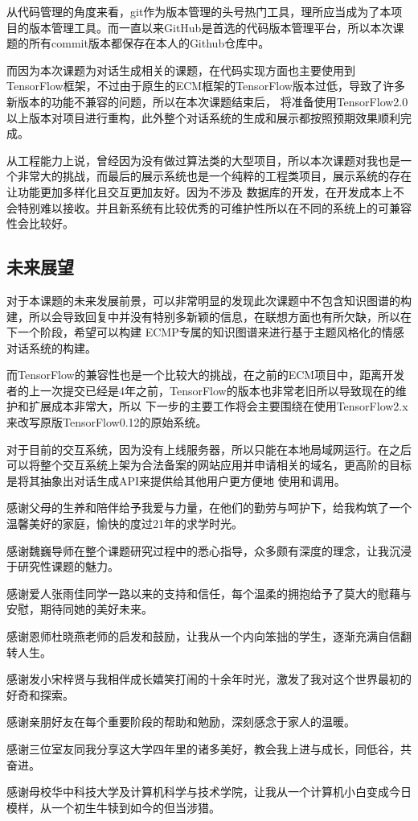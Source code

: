 \documentclass[supercite]{HustGraduPaper}
\theoremstyle{definition}
\begin{document}
从代码管理的角度来看，git作为版本管理的头号热门工具，理所应当成为了本项目的版本管理工具。而一直以来GitHub是首选的代码版本管理平台，所以本次课题的所有commit版本都保存在本人的Github仓库中。

而因为本次课题为对话生成相关的课题，在代码实现方面也主要使用到TensorFlow框架，不过由于原生的ECM框架的TensorFlow版本过低，导致了许多新版本的功能不兼容的问题，所以在本次课题结束后，
将准备使用TensorFlow2.0以上版本对项目进行重构，此外整个对话系统的生成和展示都按照预期效果顺利完成。

从工程能力上说，曾经因为没有做过算法类的大型项目，所以本次课题对我也是一个非常大的挑战，而最后的展示系统也是一个纯粹的工程类项目，展示系统的存在让功能更加多样化且交互更加友好。因为不涉及
数据库的开发，在开发成本上不会特别难以接收。并且新系统有比较优秀的可维护性所以在不同的系统上的可兼容性会比较好。

\subsection{未来展望}
对于本课题的未来发展前景，可以非常明显的发现此次课题中不包含知识图谱的构建，所以会导致回复中并没有特别多新颖的信息，在联想方面也有所欠缺，所以在下一个阶段，希望可以构建
ECMP专属的知识图谱来进行基于主题风格化的情感对话系统的构建。

而TensorFlow的兼容性也是一个比较大的挑战，在之前的ECM项目中，距离开发者的上一次提交已经是4年之前，TensorFlow的版本也非常老旧所以导致现在的维护和扩展成本非常大，所以
下一步的主要工作将会主要围绕在使用TensorFlow2.x来改写原版TensorFlow0.12的原始系统。

对于目前的交互系统，因为没有上线服务器，所以只能在本地局域网运行。在之后可以将整个交互系统上架为合法备案的网站应用并申请相关的域名，更高阶的目标是将其抽象出对话生成API来提供给其他用户更方便地
使用和调用。


\begin{thankpage}
感谢父母的生养和陪伴给予我爱与力量，在他们的勤劳与呵护下，给我构筑了一个温馨美好的家庭，愉快的度过21年的求学时光。

感谢魏巍导师在整个课题研究过程中的悉心指导，众多颇有深度的理念，让我沉浸于研究性课题的魅力。

感谢爱人张雨佳同学一路以来的支持和信任，每个温柔的拥抱给予了莫大的慰藉与安慰，期待同她的美好未来。

感谢恩师杜晓燕老师的启发和鼓励，让我从一个内向笨拙的学生，逐渐充满自信翻转人生。

感谢发小宋梓贤与我相伴成长嬉笑打闹的十余年时光，激发了我对这个世界最初的好奇和探索。

感谢亲朋好友在每个重要阶段的帮助和勉励，深刻感念于家人的温暖。

感谢三位室友同我分享这大学四年里的诸多美好，教会我上进与成长，同低谷，共奋进。

感谢母校华中科技大学及计算机科学与技术学院，让我从一个计算机小白变成今日模样，从一个初生牛犊到如今的但当涉猎。

\end{thankpage}

\nocite{*}


\end{document}
